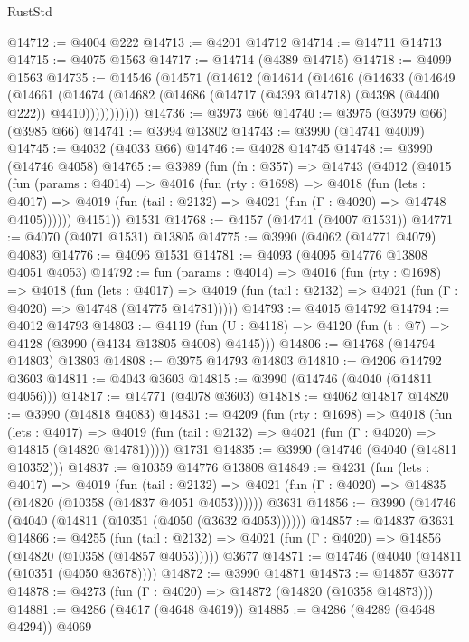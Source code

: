 \begin{lexlean}{RustStd}
\begin{coremodule}
@14712 := @4004 @222
@14713 := @4201 @14712
@14714 := @14711 @14713
@14715 := @4075 @1563
@14717 := @14714 (@4389 @14715)
@14718 := @4099 @1563
@14735 := @14546
    (@14571
      (@14612
        (@14614
          (@14616
            (@14633
              (@14649
                (@14661
                  (@14674
                    (@14682 (@14686 (@14717 (@4393 @14718) (@4398 (@4400 @222)) @4410)))))))))))
@14736 := @3973 @66
@14740 := @3975 (@3979 @66) (@3985 @66)
@14741 := @3994 @13802
@14743 := @3990 (@14741 @4009)
@14745 := @4032 (@4033 @66)
@14746 := @4028 @14745
@14748 := @3990 (@14746 @4058)
@14765 := @3989
    (fun (fn : @357) =>
    @14743
      (@4012
        (@4015
          (fun (params : @4014) =>
          @4016
            (fun (rty : @1698) =>
            @4018
              (fun (lets : @4017) =>
              @4019 (fun (tail : @2132) => @4021 (fun (Γ : @4020) => @14748 @4105))))))
        @4151))
    @1531
@14768 := @4157 (@14741 (@4007 @1531))
@14771 := @4070 (@4071 @1531) @13805
@14775 := @3990 (@4062 (@14771 @4079) @4083)
@14776 := @4096 @1531
@14781 := @4093 (@4095 @14776 @13808 @4051 @4053)
@14792 := fun (params : @4014) =>
  @4016
    (fun (rty : @1698) =>
    @4018
      (fun (lets : @4017) =>
      @4019 (fun (tail : @2132) => @4021 (fun (Γ : @4020) => @14748 (@14775 @14781)))))
@14793 := @4015 @14792
@14794 := @4012 @14793
@14803 := @4119
    (fun (U : @4118) => @4120 (fun (t : @7) => @4128 (@3990 (@4134 @13805 @4008) @4145)))
@14806 := @14768 (@14794 @14803) @13803
@14808 := @3975 @14793 @14803
@14810 := @4206 @14792 @3603
@14811 := @4043 @3603
@14815 := @3990 (@14746 (@4040 (@14811 @4056)))
@14817 := @14771 (@4078 @3603)
@14818 := @4062 @14817
@14820 := @3990 (@14818 @4083)
@14831 := @4209
    (fun (rty : @1698) =>
    @4018
      (fun (lets : @4017) =>
      @4019 (fun (tail : @2132) => @4021 (fun (Γ : @4020) => @14815 (@14820 @14781)))))
    @1731
@14835 := @3990 (@14746 (@4040 (@14811 @10352)))
@14837 := @10359 @14776 @13808
@14849 := @4231
    (fun (lets : @4017) =>
    @4019
      (fun (tail : @2132) =>
      @4021 (fun (Γ : @4020) => @14835 (@14820 (@10358 (@14837 @4051 @4053))))))
    @3631
@14856 := @3990 (@14746 (@4040 (@14811 (@10351 (@4050 (@3632 @4053))))))
@14857 := @14837 @3631
@14866 := @4255
    (fun (tail : @2132) => @4021 (fun (Γ : @4020) => @14856 (@14820 (@10358 (@14857 @4053)))))
    @3677
@14871 := @14746 (@4040 (@14811 (@10351 (@4050 @3678))))
@14872 := @3990 @14871
@14873 := @14857 @3677
@14878 := @4273 (fun (Γ : @4020) => @14872 (@14820 (@10358 @14873)))
@14881 := @4286 (@4617 (@4648 @4619))
@14885 := @4286 (@4289 (@4648 @4294)) @4069

\end{coremodule}
\end{lexlean}
